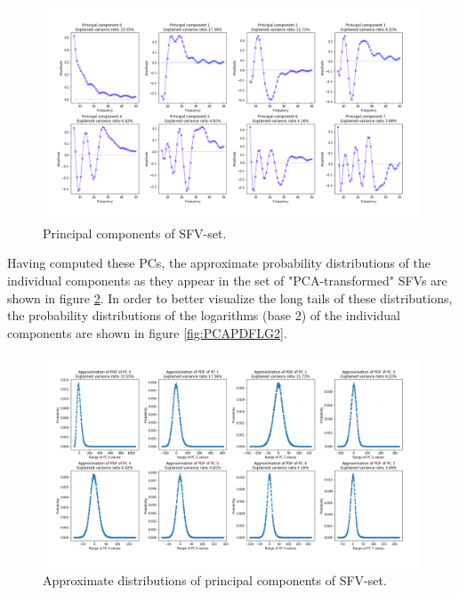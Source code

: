 \documentclass{article}
\begin{document}
\begin{figure}[H]
    \centering
    \centerline{\includegraphics[width=1\textwidth]{images/PCA/PCS.png}}
    \caption{Principal components of SFV-set.}
    \label{fig:PCS}
\end{figure}

Having computed these PCs, the approximate probability distributions of the individual components as they appear in the set of "PCA-transformed" SFVs are shown in figure \ref{fig:PCAPDF}. 
In order to better visualize the long tails of these distributions, the probability distributions of the logarithms (base 2) of the individual components are shown in figure \ref{fig:PCAPDFLG2}.

\begin{figure}[H]
    \centering
    \centerline{\includegraphics[width=1\textwidth]{images/PCA/PCAPDF.png}}
    \caption{Approximate distributions of principal components of SFV-set.}
    \label{fig:PCAPDF}
\end{figure}
\end{document}
